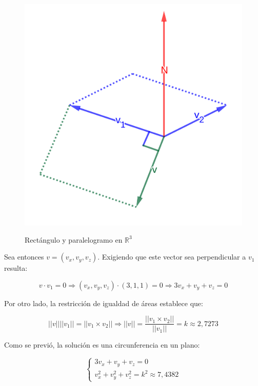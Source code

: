 \documentclass{article}
\renewcommand{\Bbb}{\mathbb}
\begin{document}
\begin{figure}[ht]
\caption{Rectángulo y paralelogramo en $\Bbb R^3$}
\includegraphics[scale=1]{img/ejercicios/1/9-d.png} 
\centering
\label{fig:1-9-d}
\end{figure}

Sea entonces $v = (v_x, v_y, v_z)$. Exigiendo que este vector sea perpendicular a $v_1$ resulta:

\begin{equation}
v \cdot v_1 = 0 \Rightarrow (v_x, v_y, v_z) \cdot (3, 1, 1) = 0 \Rightarrow 3 v_x + v_y + v_z = 0
\end{equation}

Por otro lado, la restricción de igualdad de áreas establece que:

\begin{equation}
||v|| ||v_1|| = ||v_1 \times v_2|| \Rightarrow ||v|| = \frac{||v_1 \times v_2||}{||v_1||} = k \approx 2,7273
\end{equation}

Como se previó, la solución es una circunferencia en un plano:

\begin{equation}
\left\{
\begin{array}{ll}
3 v_x + v_y + v_z = 0 \\
v_x^2 + v_y^2 + v_z^2 = k^2 \approx 7,4382
\end{array}
\right.
\end{equation}
\end{document}
